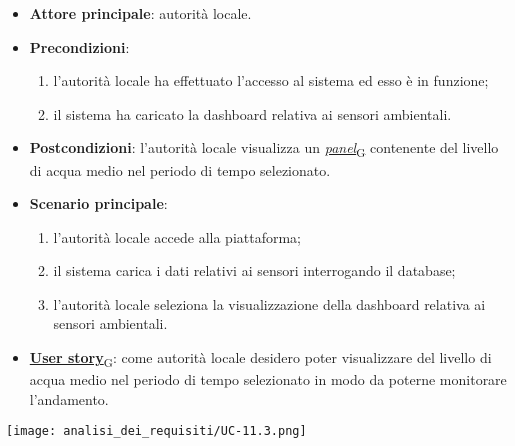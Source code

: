 \begin{itemize}
	\item \textbf{Attore principale}: autorità locale.
	\item \textbf{Precondizioni}:
	      \begin{enumerate}
		      \item l'autorità locale ha effettuato l'accesso al sistema ed esso è in funzione;
		      \item il sistema ha caricato la dashboard relativa ai sensori ambientali.
	      \end{enumerate}
	\item \textbf{Postcondizioni}: l'autorità locale visualizza un \href{https://7last.github.io/docs/pb/documentazione-interna/glossario\#panel}{\textit{panel}\textsubscript{G}} contenente del livello di acqua medio nel periodo di tempo selezionato.
	\item \textbf{Scenario principale}:
	      \begin{enumerate}
		      \item l'autorità locale accede alla piattaforma;
		      \item il sistema carica i dati relativi ai sensori interrogando il database;
		      \item l'autorità locale seleziona la visualizzazione della dashboard relativa ai sensori ambientali.
	      \end{enumerate}
	\item \href{https://7last.github.io/docs/pb/documentazione-interna/glossario\#user-story}{\textbf{User story}\textsubscript{G}}:
	      come autorità locale desidero poter visualizzare del livello di acqua medio nel periodo di tempo selezionato
	      in modo da poterne monitorare l'andamento.
\end{itemize}
\begin{center}
	\texttt{[image: analisi\_dei\_requisiti/UC-11.3.png]}
\end{center}


